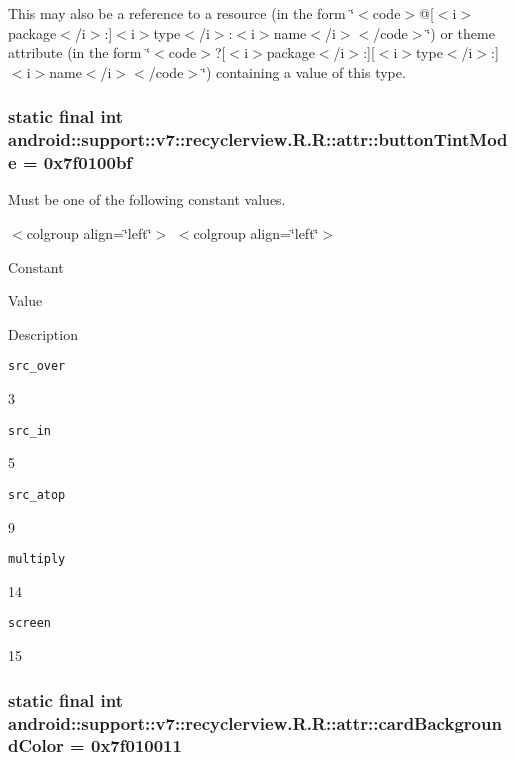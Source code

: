 This may also be a reference to a resource (in the form \char`\"{}$<$code$>$@\mbox{[}$<$i$>$package$<$/i$>$:\mbox{]}$<$i$>$type$<$/i$>$:$<$i$>$name$<$/i$>$$<$/code$>$\char`\"{}) or theme attribute (in the form \char`\"{}$<$code$>$?\mbox{[}$<$i$>$package$<$/i$>$:\mbox{]}\mbox{[}$<$i$>$type$<$/i$>$:\mbox{]}$<$i$>$name$<$/i$>$$<$/code$>$\char`\"{}) containing a value of this type. \hypertarget{classandroid_1_1support_1_1v7_1_1recyclerview_1_1_r_1_1attr_b9a92b4c7d5e17b7c9dee6f187ba3c73}{
\subsubsection[{buttonTintMode}]{\setlength{\rightskip}{0pt plus 5cm}static final int android::support::v7::recyclerview.R.R::attr::buttonTintMode = 0x7f0100bf}}
\label{classandroid_1_1support_1_1v7_1_1recyclerview_1_1_r_1_1attr_b9a92b4c7d5e17b7c9dee6f187ba3c73}


Must be one of the following constant values. \begin{TabularC}{0}
\hline
\end{TabularC}
$<$colgroup align=\char`\"{}left\char`\"{}$>$ $<$colgroup align=\char`\"{}left\char`\"{}$>$ 

Constant

Value

Description 

{\tt src\_\-over}

3

{\tt src\_\-in}

5

{\tt src\_\-atop}

9

{\tt multiply}

14

{\tt screen}

15\hypertarget{classandroid_1_1support_1_1v7_1_1recyclerview_1_1_r_1_1attr_5c6478bbaeb845753019e4ee892f0dc9}{
\subsubsection[{cardBackgroundColor}]{\setlength{\rightskip}{0pt plus 5cm}static final int android::support::v7::recyclerview.R.R::attr::cardBackgroundColor = 0x7f010011}}
\label{classandroid_1_1support_1_1v7_1_1recyclerview_1_1_r_1_1attr_5c6478bbaeb845753019e4ee892f0dc9}


